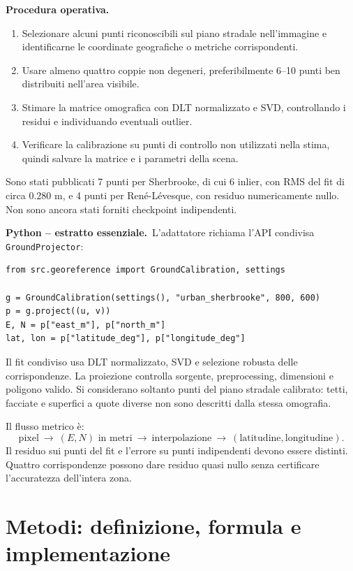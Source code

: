 \documentclass[11pt,a4paper]{article}
\newcommand{\python}{\textbf{Python -- estratto essenziale.}}
\numberwithin{equation}{section}
\begin{document}
\textbf{Procedura operativa.}
\begin{enumerate}
  \item Selezionare alcuni punti riconoscibili sul piano stradale
  nell'immagine e identificarne le coordinate geografiche o metriche
  corrispondenti.
  \item Usare almeno quattro coppie non degeneri, preferibilmente 6--10
  punti ben distribuiti nell'area visibile.
  \item Stimare la matrice omografica con DLT normalizzato e SVD,
  controllando i residui e individuando eventuali outlier.
  \item Verificare la calibrazione su punti di controllo non utilizzati
  nella stima, quindi salvare la matrice e i parametri della scena.
\end{enumerate}

Sono stati pubblicati 7 punti per Sherbrooke, di cui 6 inlier, con RMS
del fit di circa \num{0.280} m, e 4 punti per René-Lévesque, con residuo
numericamente nullo. Non sono ancora stati forniti checkpoint indipendenti.

\python\ L'adattatore richiama l'API condivisa \texttt{GroundProjector}:
\begin{lstlisting}
from src.georeference import GroundCalibration, settings

g = GroundCalibration(settings(), "urban_sherbrooke", 800, 600)
p = g.project((u, v))
E, N = p["east_m"], p["north_m"]
lat, lon = p["latitude_deg"], p["longitude_deg"]
\end{lstlisting}

Il fit condiviso usa DLT normalizzato, SVD e selezione robusta delle
corrispondenze. La proiezione controlla sorgente, preprocessing,
dimensioni e poligono valido. Si considerano soltanto punti del piano
stradale calibrato: tetti, facciate e superfici a quote diverse non sono
descritti dalla stessa omografia.

Il flusso metrico è:
\[
 \text{pixel}\ \longrightarrow\ (E,N)\text{ in metri}\
 \longrightarrow\ \text{interpolazione}\
 \longrightarrow\ (\text{latitudine},\text{longitudine}).
\]
Il residuo sui punti del fit e l'errore su punti indipendenti devono
essere distinti. Quattro corrispondenze possono dare residuo quasi nullo
senza certificare l'accuratezza dell'intera zona.

\section{Metodi: definizione, formula e implementazione}
\end{document}
